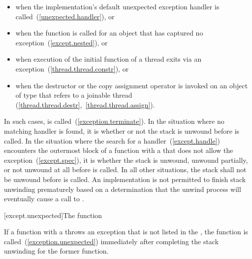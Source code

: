 \begin{itemize}
\item%
when the implementation's default
unexpected exception handler
is called~(\ref{unexpected.handler}), or

\item%
when the function  is called for an object
that has captured no exception~(\ref{except.nested}), or

\item%
when execution of the initial function of a thread exits via
an exception~(\ref{thread.thread.constr}), or

\item%
when the destructor or the copy assignment operator is invoked on an object
of type  that refers to a joinable thread
(\ref{thread.thread.destr},~\ref{thread.thread.assign}).

\end{itemize}

\exitnote

\pnum
{}%
In such cases,
is called~(\ref{exception.terminate}).
In the situation where no matching handler is found, it is
 whether or not the
stack is unwound
before
is called.
In the situation where the search for a handler~(\ref{except.handle}) encounters the
outermost block of a function with a 
that does not allow the exception~(\ref{except.spec}), it is
whether the stack is unwound, unwound partially, or not unwound at all
before  is called.
In all other situations, the stack shall not be unwound before
is called.
An implementation is not permitted to finish stack unwinding
prematurely based on a determination that the unwind process
will eventually cause a call to
.

[except.unexpected]{The  function}

\pnum
{}%
If a function with
a 
throws an exception that is not listed in the
,
the function
is called~(\ref{exception.unexpected}) immediately after completing
the stack unwinding for the former function.

